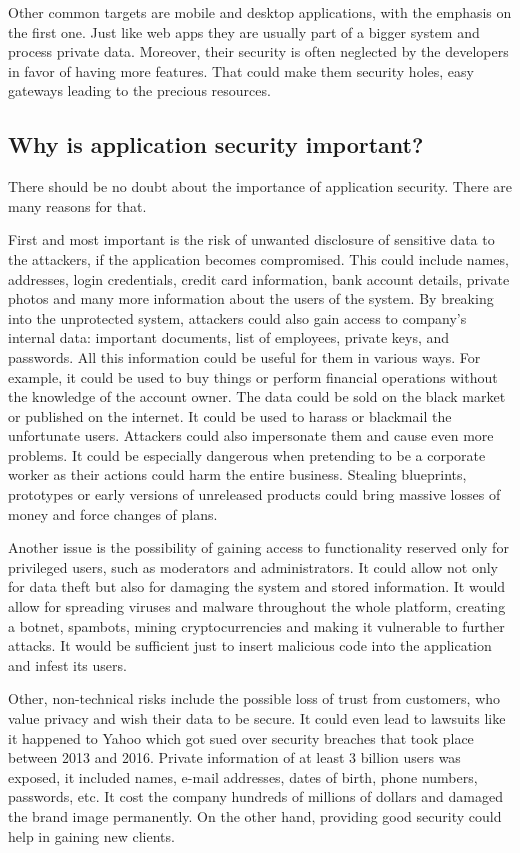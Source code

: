 \documentclass[a4paper]{article}
\begin{document}
Other common targets are mobile and desktop applications, with the emphasis on
the first one. Just like web apps they are usually part of a bigger system and
process private data. Moreover, their security is often neglected by the
developers in favor of having more features.\autocite{mobappsec} That could
make them security holes, easy gateways leading to the precious resources.

\subsection{Why is application security important?}

There should be no doubt about the importance of application security. There are
many reasons for that.

First and most important is the risk of unwanted disclosure of sensitive data
to the attackers, if the application becomes compromised. This could include
names, addresses, login credentials, credit card information, bank account
details, private photos and many more information about the users of the
system. By breaking into the unprotected system, attackers could also gain
access to company's internal data: important documents, list of employees,
private keys, and passwords. All this information could be useful for them in
various ways.  For example, it could be used to buy things or perform financial
operations without the knowledge of the account owner. The data could be sold
on the black market or published on the internet. It could be used to harass or
blackmail the unfortunate users. Attackers could also impersonate them and
cause even more problems.\autocite{stolendata} It could be especially dangerous
when pretending to be a corporate worker as their actions could harm the entire
business. Stealing blueprints, prototypes or early versions of unreleased
products could bring massive losses of money and force changes of plans.

Another issue is the possibility of gaining access to functionality reserved
only for privileged users, such as moderators and administrators. It could allow
not only for data theft but also for damaging the system and stored
information. It would allow for spreading viruses and malware throughout the
whole platform, creating a botnet, spambots, mining cryptocurrencies and making
it vulnerable to further attacks. It would be sufficient just to insert
malicious code into the application and infest its users.\autocite{wahh}

Other, non-technical risks include the possible loss of trust from customers,
who value privacy and wish their data to be secure.\autocite{appsecimp} It
could even lead to lawsuits like it happened to Yahoo which got sued over
security breaches that took place between 2013 and
2016.\autocite{yahoobreaches} Private information of at least 3 billion users
was exposed, it included names, e-mail addresses, dates of birth, phone
numbers, passwords, etc. It cost the company hundreds of millions of dollars
and damaged the brand image permanently. On the other hand, providing good
security could help in gaining new clients.
\end{document}
